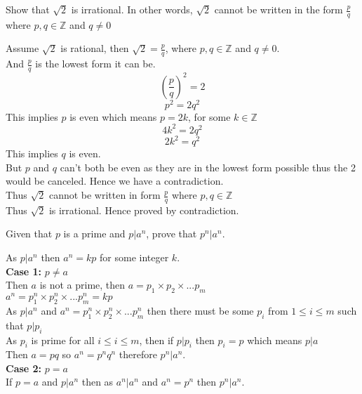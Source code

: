 \documentclass[addpoints]{exam}
\newenvironment{problem}[2][Problem]{\begin{trivlist}
    \item[\hskip \labelsep {\bfseries #1}\hskip \labelsep {\bfseries #2.}]}{\end{trivlist}}
\begin{document}
\begin{sloppypar}
    \begin{problem}{12}
    Show that $\sqrt{2}$ is irrational. In other words, $\sqrt{2}$ cannot be written in the form $\frac{p}{q}$ where $p,q \in \mathbb{Z}$ and $q \neq 0$
    \end{problem}
    
    \begin{questions}
        \question
        \begin{solution}
            
            Assume $\sqrt{2}$ is rational, then $\sqrt{2} = \frac{p}{q}$, where $p,q \in \mathbb{Z}$ and $q \neq 0$.
            \\And $\frac{p}{q}$ is the lowest form it can be. 
            $$\left(\frac{p}{q}\right)^2 = 2$$
            $$p^2 = 2 q^2$$
            This implies $p$ is even which means $p = 2k$, for some $k \in \mathbb{Z}$
            $$4k^2 = 2 q^2$$
            $$2k^2 = q^2$$
            This implies $q$ is even.
            \\But $p$ and $q$ can't both be even as they are in the lowest form possible thus the 2 would be canceled. Hence we have a contradiction.
            \\Thus $\sqrt{2}$ cannot be written in form $\frac{p}{q}$ where $p,q \in \mathbb{Z}$
            \\Thus $\sqrt{2}$ is irrational. Hence proved by contradiction.
        \end{solution}
    \end{questions}

    \begin{problem}{13}
    Given that $p$ is a prime and $p|a^n$, prove that $p^n|a^n$. 
    \end{problem}

    \begin{questions}
        \question
        \begin{solution}
            
            As $p|a^n$ then $a^n = kp$ for some integer $k$.
            \\\textbf{Case 1:} $p \neq a$
            \\Then $a$ is not a prime, then $a = p_1\times p_2 \times ... p_m$
            \\$a^n = p_1^n\times p_2^n \times ... p_m^n = kp$
            \\As $p|a^n$ and $a^n = p_1^n\times p_2^n \times ... p_m^n$ then there must be some $p_i$ from $1\leq i \leq m$ such that $p|p_i$
            \\As $p_i$ is prime for all $i \leq i \leq m$, then if $p|p_i$ then $p_i = p$ which means $p|a$
            \\Then $a = pq$ so $a^n = p^n q^n$ therefore $p^n|a^n$.
            \\\textbf{Case 2:} $p = a$ 
            \\If $p = a$  and $p|a^n$ then as $a^n|a^n$ and $a^n=p^n$ then $p^n|a^n$.
        \end{solution}
    \end{questions}


\end{sloppypar}
\end{document}
